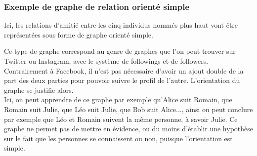 \documentclass[12pt]{report}
\begin{document}
\subsubsection{Exemple de graphe de relation orienté simple}
Ici, les relations d'amitié entre les cinq individus nommés plus haut vont être représentées sous forme de graphe orienté simple. \\
\begin{center}
\end{center}

Ce type de graphe correspond au genre de graphes que l'on peut trouver sur Twitter ou Instagram, avec le système de followings et de followers. Contrairement à Facebook, il n'est pas nécessaire d'avoir un ajout double de la part des deux parties pour pouvoir suivre le profil de l'autre. L'orientation du graphe se justifie alors.\\
Ici, on peut apprendre de ce graphe par exemple qu'Alice suit Romain, que Romain suit Julie, que Léo suit Julie, que Bob suit Alice..., ainsi on peut conclure par exemple que Léo et Romain suivent la même personne, à savoir Julie. Ce graphe ne permet pas de mettre en évidence, ou du moins d'établir une hypothèse sur le fait que les personnes se connaissent ou non, puisque l'orientation est simple. 
\end{document}
